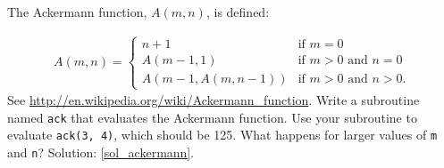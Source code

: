 \begin{exercise}
\label{ackermann}

The Ackermann function, $A(m, n)$, is defined:

\begin{eqnarray*}
A(m, n) = \begin{cases} 
              n+1 & \mbox{if } m = 0 \\ 
        A(m-1, 1) & \mbox{if } m > 0 \mbox{ and } n = 0 \\ 
A(m-1, A(m, n-1)) & \mbox{if } m > 0 \mbox{ and } n > 0.
\end{cases} 
\end{eqnarray*}
%
See \url{http://en.wikipedia.org/wiki/Ackermann_function}.
Write a subroutine named {\tt ack} that evaluates the Ackermann function.
Use your subroutine to evaluate {\tt ack(3, 4)}, which should be 125.
What happens for larger values of {\tt m} and {\tt n}?
Solution: \ref{sol_ackermann}.

\end{exercise}


